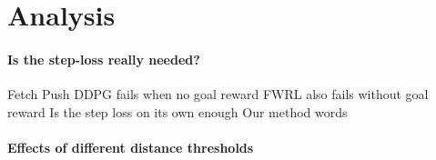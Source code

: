 \section{Analysis}

\paragraph{Is the step-loss really needed?}
Fetch Push
DDPG fails when no goal reward
FWRL also fails without goal reward
Is the step loss on its own enough
Our method words 

\paragraph{Effects of different distance thresholds}



